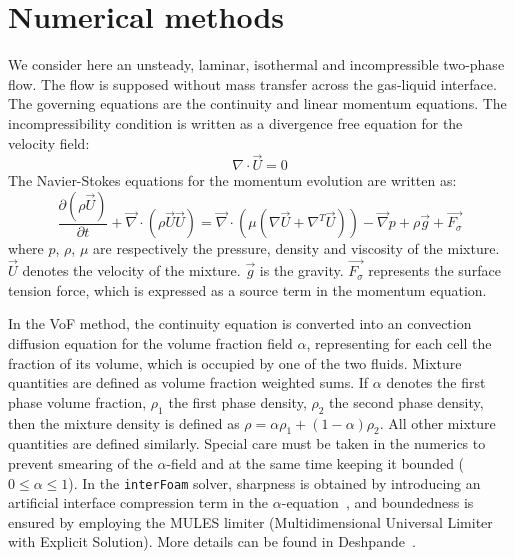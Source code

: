 \documentclass[review]{elsarticle}
\begin{document}
\section{Numerical methods}
We consider here an unsteady, laminar, isothermal and incompressible two-phase flow. The flow is supposed without mass transfer across the gas-liquid interface. The governing equations are the continuity and linear momentum equations. The incompressibility condition is written as a divergence free equation for the velocity field:
\begin{equation}
  \nabla \cdot \overrightarrow{U} = 0
\end{equation}
The Navier-Stokes equations for the momentum evolution are written as: 
\begin{equation}
  \frac{\partial(\rho \overrightarrow{U})}{\partial t} + 
  \overrightarrow{\nabla} \cdot (\rho\overrightarrow{U}\overrightarrow{U}) = 
  \overrightarrow{\nabla} \cdot \left( \mu (\nabla\overrightarrow{U}+\nabla^T\overrightarrow{U})\right)
  - \overrightarrow{\nabla} p + \rho \overrightarrow{g} + \overrightarrow{F_{\sigma}}
\end{equation}
where $p$, $\rho$, $\mu$ are respectively the pressure, density and viscosity of the mixture. $\overrightarrow{U}$ denotes the velocity of the mixture. $\overrightarrow{g}$ is the gravity. $\overrightarrow{F_{\sigma}}$ represents the surface tension force, which is expressed as a source term in the momentum equation. 

In the VoF method, the continuity equation is converted into an convection diffusion equation for the volume fraction field $\alpha$, representing for each cell the fraction of its volume, which is occupied by one of the two fluids. Mixture quantities are defined as volume fraction weighted sums. If $\alpha$ denotes the first phase volume fraction, $\rho_1$ the first phase density, $\rho_2$ the second phase density, then the mixture density is defined as $\rho = \alpha\rho_1 + (1-\alpha)\rho_2$. All other mixture quantities are defined similarly. 
Special care must be taken in the numerics to prevent smearing of the $\alpha$-field and at the same time keeping it bounded ($0\leq \alpha\leq 1$). In the \verb|interFoam| solver, sharpness is obtained by introducing an artificial interface compression term in the $\alpha$-equation~\cite{Weller2008}, and boundedness is ensured by employing the MULES limiter (Multidimensional Universal Limiter with Explicit Solution). More details can be found in Deshpande~\cite{Deshpande2012}.
\end{document}
